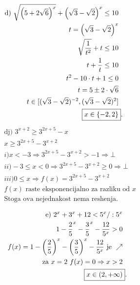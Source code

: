 \documentclass[11pt]{article}
\begin{document}
\begin{zad}
\begin{multicols}{2}
\begin{align*}
\text{d) }  \sqrt{\left(5+2\sqrt 6\right)^x}+\left(\sqrt 3 -\sqrt 2\right)^x\leq 10\\
t=\left(\sqrt 3 -\sqrt 2\right)^x\\
\sqrt{\frac{1}{t^2}}+t\leq10\\
t+\frac{1}{t}\leq 10\\
t^2-10\cdot t +1\leq 0\\
t=5\pm2\cdot\sqrt{6}\\
t\in[(\sqrt 3 -\sqrt 2)^{-2},(\sqrt 3 -\sqrt 2)^2]\\
\Aboxed{x\in\{-2,2\}}.
\end{align*}
\begin{align*}
&\text{dj) } 3^{x+2}\geq 3^{2x+5}-x\\
&x\geq 3^{2x+5}-3^{x+2}\\
&i)x<-3\Rightarrow 3^{2x+5}-3^{x+2}>-1\Rightarrow\bot\\
&ii)-3\leq x<0\Rightarrow 3^{2x+5}-3^{x+2}\geq0\Rightarrow\bot\\
&iii)0\leq x\Rightarrow f(x)=3^{2x+5}-3^{x+2} \\
&f(x)\text{ raste eksponencijalno za razliku od }x\\
&\text{Stoga ova nejednakost nema reshenja.}\\[-5mm]
\end{align*}
\begin{align*}
\text{e) } 2^x+3^x+12<5^x/:5^x&\\
1-\frac{2}{5}^x-\frac{3}{5}^x-\frac{12}{5^x}>0&\\
f(x)=1-\left(\frac{2}{5}\right)^x-\left(\frac{3}{5}\right)^x-\frac{12}{5^x}\text{ je }\nearrow&\\
\text{za }x=2\text{ } f(x)=0\Rightarrow x>2&\\
\Aboxed{x\in(2,+\infty)}.
\end{align*}
\end{multicols}
\end{zad}
\end{document}
